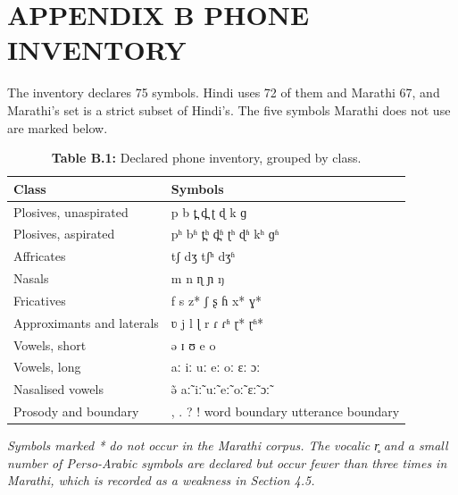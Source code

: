 \documentclass[12pt,a4paper]{article}
\DeclareRobustCommand{\ipa}[1]{{\ipafont #1}}
\begin{document}
\section*{APPENDIX B  PHONE INVENTORY}
The inventory declares 75 symbols. Hindi uses 72 of them and Marathi 67, and Marathi's set is a strict subset of Hindi's. The five symbols Marathi does not use are marked below.

\begin{table}[htbp]
  \centering
  \small
  \caption*{\textbf{Table B.1:}  Declared phone inventory, grouped by class.}
  \begin{tabular}{p{1.63in}p{4.00in}}
  \toprule
  \textbf{Class} & \textbf{Symbols} \\
  \midrule
  Plosives, unaspirated & p  b  \ipa{t̪}  \ipa{d̪}  \ipa{ʈ}  \ipa{ɖ}  k  \ipa{ɡ} \\
  Plosives, aspirated & \ipa{pʰ}  \ipa{bʱ}  \ipa{t̪ʰ}  \ipa{d̪ʱ}  \ipa{ʈʰ}  \ipa{ɖʱ}  \ipa{kʰ}  \ipa{ɡʱ} \\
  Affricates & \ipa{tʃ}  \ipa{dʒ}  \ipa{tʃʰ}  \ipa{dʒʱ} \\
  Nasals & m  n  \ipa{ɳ}  \ipa{ɲ}  ŋ \\
  Fricatives & f  s  z*  \ipa{ʃ}  \ipa{ʂ}  \ipa{ɦ}  x*  \ipa{ɣ}* \\
  Approximants and laterals & \ipa{ʋ}  j  l  \ipa{ɭ}  r  \ipa{ɾ}  \ipa{ɾʱ}  \ipa{ɽ}*  \ipa{ɽʱ}* \\
  Vowels, short & \ipa{ə}  \ipa{ɪ}  \ipa{ʊ}  e  o \\
  Vowels, long & \ipa{aː}  \ipa{iː}  \ipa{uː}  \ipa{eː}  \ipa{oː}  \ipa{ɛː}  \ipa{ɔː} \\
  Nasalised vowels & \ipa{ə̃}  \ipa{aː̃}  \ipa{iː̃}  \ipa{uː̃}  \ipa{eː̃}  \ipa{oː̃}  \ipa{ɛː̃}  \ipa{ɔː̃} \\
  Prosody and boundary & ,  .  ?  !  word boundary  utterance boundary \\
  \bottomrule
  \end{tabular}
  \par\vspace{3pt}\begin{minipage}{5.95in}\footnotesize\itshape Symbols marked * do not occur in the Marathi corpus. The vocalic \ipa{r̥} and a small number of Perso-Arabic symbols are declared but occur fewer than three times in Marathi, which is recorded as a weakness in Section 4.5.\end{minipage}
\end{table}
\end{document}
